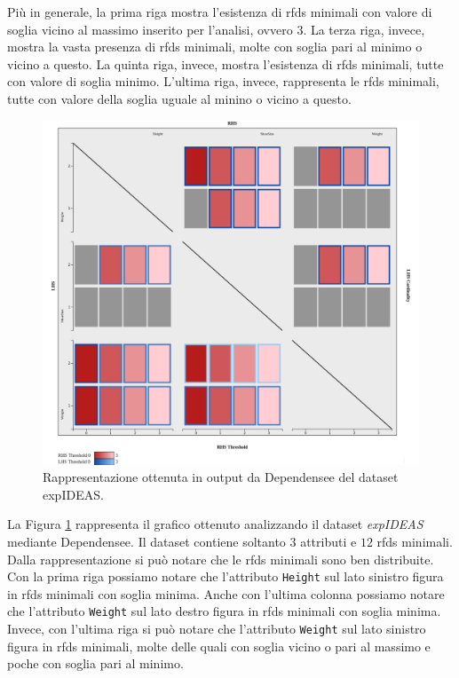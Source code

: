 Pi\`{u} in generale, la prima riga mostra l'esistenza di \acrlong{rfds} minimali con valore di soglia vicino al massimo inserito per l'analisi, ovvero $3$. La terza riga, invece, mostra la vasta presenza di \acrlong{rfds} minimali, molte con soglia pari al minimo o vicino a questo. La quinta riga, invece, mostra l'esistenza di \acrlong{rfds} minimali, tutte con valore di soglia minimo. L'ultima riga, invece, rappresenta le \acrshort{rfds} minimali, tutte con valore della soglia uguale al minino o vicino a questo.\par
\begin{figure}[H]
    \centering
    \includegraphics[width=\linewidth]{capitoli/figure/expIDEAS}
    \caption{Rappresentazione ottenuta in output da Dependensee del dataset expIDEAS.}
    \label{fig:expidea_result}
\end{figure}
La Figura \ref{fig:expidea_result} rappresenta il grafico ottenuto analizzando il dataset \textit{expIDEAS} mediante Dependensee. Il dataset contiene soltanto $3$ attributi e $12$ \acrlong{rfds} minimali. Dalla rappresentazione si pu\`{o} notare che le \acrlong{rfds} minimali sono ben distribuite. Con la prima riga possiamo notare che l'attributo \texttt{Height} sul lato sinistro figura in \acrlong{rfds} minimali con soglia minima. Anche con l'ultima colonna possiamo notare che l'attributo \texttt{Weight} sul lato destro figura in \acrlong{rfds} minimali con soglia minima. Invece, con l'ultima riga si pu\`{o} notare che l'attributo \texttt{Weight} sul lato sinistro figura in \acrlong{rfds} minimali, molte delle quali con soglia vicino o pari al massimo e poche con soglia pari al minimo.\par
